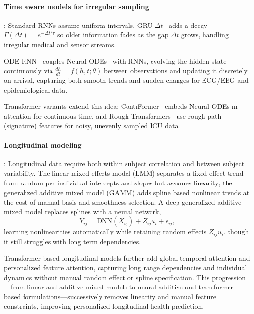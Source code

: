 \documentclass[journal]{IEEEtran}
\providecommand{\Description}[1]{}
\begin{document}
\paragraph{Time aware models for irregular sampling}: Standard RNNs assume uniform intervals. GRU-$\Delta t$~\cite{metzger2023crop} adds a decay $\Gamma(\Delta t)=e^{-\Delta t/\tau}$ so older information fades as the gap $\Delta t$ grows, handling irregular medical and sensor streams.

ODE-RNN~\cite{rubanova2019latent} couples Neural ODEs~\cite{chen2018neural} with RNNs, evolving the hidden state continuously via $\frac{dh}{dt}=f(h,t;\theta)$ between observations and updating it discretely on arrival, capturing both smooth trends and sudden changes for ECG/EEG and epidemiological data.

Transformer variants extend this idea: ContiFormer~\cite{chen2023contiformer} embeds Neural ODEs in attention for continuous time, and Rough Transformers~\cite{morenopino2024rough} use rough path (signature) features for noisy, unevenly sampled ICU data.



\paragraph{Longitudinal modeling}: Longitudinal data require both within subject correlation and between subject variability. The linear mixed-effects model (LMM) separates a fixed effect trend from random per individual intercepts and slopes but assumes linearity; the generalized additive mixed model (GAMM) adds spline based nonlinear trends at the cost of manual basis and smoothness selection. A deep generalized additive mixed model replaces splines with a neural network,
\[
Y_{ij} = \mathrm{DNN}(X_{ij}) + Z_{ij} u_i + \epsilon_{ij},
\]
learning nonlinearities automatically while retaining random effects $Z_{ij}u_i$, though it still struggles with long term dependencies.

Transformer based longitudinal models further add global temporal attention and personalized feature attention, capturing long range dependencies and individual dynamics without manual random effect or spline specification. This progression---from linear and additive mixed models to neural additive and transformer based formulations---successively removes linearity and manual feature constraints, improving personalized longitudinal health prediction.
\end{document}
